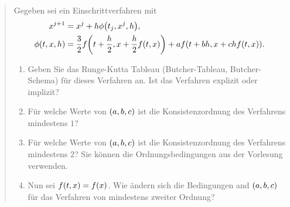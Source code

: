 \documentclass{exercise}
\begin{document}
	\begin{quote}
		Gegeben sei ein Einschrittverfahren mit
		\begin{align*}
			x^{j + 1} &= x^j + h\phi\parentheses*{t_j, x^j, h},\\
			\phi\parentheses*{t, x, h} &= \frac{3}{2}f\parentheses*{t + \frac{h}{2}, x + \frac{h}{2}f\parentheses*{t, x}} + af\parentheses*{t + bh, x + chf\parentheses*{t, x}}.
		\end{align*}
		\begin{enumerate}
			\item Geben Sie das Runge-Kutta Tableau (Butcher-Tableau, Butcher-Schema) für dieses Verfahren an.
			Ist das Verfahren explizit oder implizit?
			\item Für welche Werte von \(\parentheses*{a, b, c}\) ist die Konsistenzordnung des Verfahrens mindestens \(1\)?
			\item Für welche Werte von \(\parentheses*{a, b, c}\) ist die Konsistenzordnung des Verfahrens mindestens \(2\)?
			Sie können die Ordnungsbedingungen aus der Vorlesung verwenden.
			\item Nun sei \(f\parentheses*{t, x} = f\parentheses*{x}\).
			Wie ändern sich die Bedingungen and \(\parentheses*{a, b, c}\) für das Verfahren von mindestens zweiter Ordnung?
		\end{enumerate}
	\end{quote}
\end{document}
